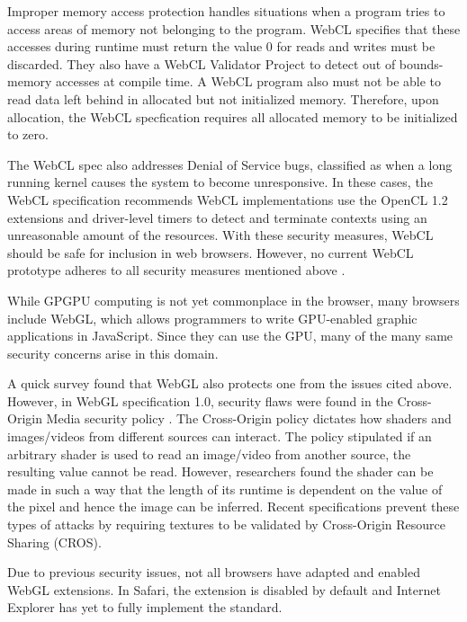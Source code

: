 Improper memory access protection handles situations when a program tries to
access areas of memory not belonging to the program. WebCL specifies that these
accesses during runtime must return the value 0 for reads and writes must be
discarded. They also have a WebCL Validator Project \cite{webclValidator} to
detect out of bounds-memory accesses at compile time. A WebCL program also must
not be able to read data left behind in allocated but not initialized memory.
Therefore, upon allocation, the WebCL specfication requires all allocated memory
to be initialized to zero.

The WebCL spec also addresses Denial of Service bugs, classified as when a long
running kernel causes the system to become unresponsive. In these cases, the
WebCL specification recommends WebCL implementations use the OpenCL 1.2
extensions and driver-level timers to detect and terminate contexts using an
unreasonable amount of the resources.  With these security measures, WebCL
should be safe for inclusion in web browsers. However, no current WebCL
prototype adheres to all security measures mentioned above \cite{nokiasecurity}.

While GPGPU computing is not yet commonplace in the browser, many browsers include
WebGL, which allows programmers to write GPU-enabled graphic applications in
JavaScript. Since they can use the GPU, many of the many same security concerns
arise in this domain. 

A quick survey found that WebGL also protects one from the issues cited above.
However, in WebGL specification 1.0, security flaws were found in the
Cross-Origin Media security policy \cite{webGLerror1, webGLerror2}. The
Cross-Origin policy dictates how shaders and images/videos from different
sources can interact. The policy stipulated if an arbitrary shader is used to
read an image/video from another source, the resulting value cannot be read.
However, researchers found the shader can be made in such a way that the length
of its runtime is dependent on the value of the pixel and hence the image can be
inferred. Recent specifications prevent these types of attacks by requiring
textures to be validated by Cross-Origin Resource Sharing (CROS).

Due to previous security issues, not all browsers have adapted and enabled WebGL
extensions. In Safari, the extension is disabled by default and Internet
Explorer has yet to fully implement the standard.

